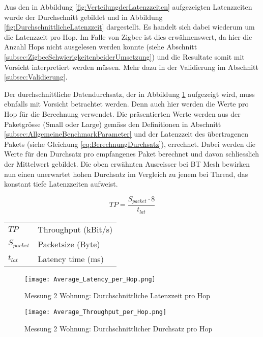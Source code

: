 Aus den in Abbildung \ref{fig:VerteilungderLatenzzeiten} aufgezeigten Latenzzeiten wurde der Durchschnitt gebildet und in Abbildung \ref{fig:DurchschnittlicheLatenzzeit} dargestellt.
Es handelt sich dabei wiederum um die Latenzzeit pro Hop. Im Falle von Zigbee ist dies erwähnenswert, da hier die Anzahl Hops nicht ausgelesen werden konnte (siehe Abschnitt \ref{subsec:ZigbeeSchwierigkeitenbeiderUmsetzung}) und die Resultate somit mit Vorsicht interpretiert werden müssen. Mehr dazu in der Validierung im Abschnitt \ref{subsec:Validierung}.

Der durchschnittliche Datendurchsatz, der in Abbildung \ref{fig:DurchschnittlicherDurchsatz} aufgezeigt wird, muss ebnfalls mit Vorsicht betrachtet werden. Denn auch hier werden die Werte pro Hop für die Berechnung verwendet.
Die präsentierten Werte werden aus der Paketgrösse (Small oder Large) gemäss den Definitionen in Abschnitt \ref{subsec:AllgemeineBenchmarkParameter} und der Latenzzeit des übertragenen Pakets (siehe Gleichung \ref{eq:BerechnungDurchsatz}), errechnet.
Dabei werden die Werte für den Durchsatz pro empfangenes Paket berechnet und davon schliesslich der Mittelwert gebildet.
Die oben erwähnten Ausreisser bei BT Mesh bewirken nun einen unerwartet hohen Durchsatz im Vergleich zu jenem bei Thread, das konstant tiefe Latenzzeiten aufweist.

\begin{equation}\label{eq:BerechnungDurchsatz}
TP =  \frac{S_{packet} \cdot 8}{t_{lat}}
\end{equation}

\begin{small}
\begin{center}
\begin{tabular}{ll}
$TP$ & Throughput (kBit/s)\\
$S_{packet}$ & Packetsize (Byte)\\
$t_{lat}$ & Latency time (ms)\\
\end{tabular}
\end{center}
\end{small}

\begin{figure}[!htbp]
\centering
\begin{minipage}[b]{0.49\textwidth}
		\centering
		\texttt{[image: Average\_Latency\_per\_Hop.png]}
		\caption{Messung 2 Wohnung: Durchschnittliche Latenzzeit pro Hop}
		\label{fig:DurchschnittlicheLatenzzeit}
\end{minipage}
\begin{minipage}[b]{0.49\textwidth}
		\centering
		\texttt{[image: Average\_Throughput\_per\_Hop.png]}
		\caption{Messung 2 Wohnung: Durchschnittlicher Durchsatz pro Hop}
		\label{fig:DurchschnittlicherDurchsatz}
\end{minipage}
\end{figure}

